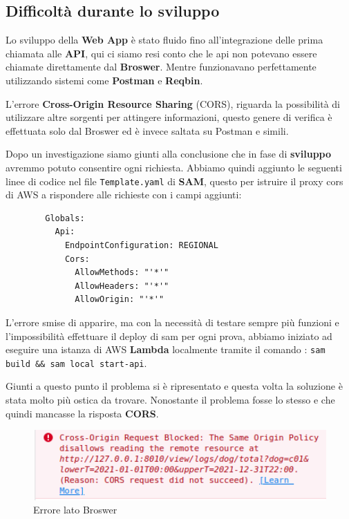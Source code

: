     \subsection{Difficoltà durante lo sviluppo}
    
        Lo sviluppo della \textbf{Web App}  è stato fluido fino all'integrazione delle prima chiamata alle \textbf{API}, qui ci siamo resi conto che le api non potevano essere chiamate direttamente dal \textbf{Broswer}.
        Mentre funzionavano perfettamente utilizzando sistemi come \textbf{Postman} e \textbf{Reqbin}. 
        
        L'errore \textbf{Cross-Origin Resource Sharing} (CORS), riguarda la possibilità di utilizzare altre sorgenti per attingere informazioni, questo genere di verifica è effettuata solo dal Broswer ed è invece saltata su Postman e simili.
        
        Dopo un investigazione siamo giunti alla conclusione che in fase di \textbf{sviluppo} avremmo potuto consentire ogni richiesta. Abbiamo quindi aggiunto le seguenti linee di codice nel file \texttt{Template.yaml} di \textbf{SAM}, questo per istruire il proxy cors di AWS a rispondere alle richieste con i campi aggiunti:
        \begin{lstlisting}
        Globals:
          Api:
            EndpointConfiguration: REGIONAL
            Cors:
              AllowMethods: "'*'"
              AllowHeaders: "'*'"
              AllowOrigin: "'*'"
        \end{lstlisting}
        
        L'errore smise di apparire, ma con la necessità di testare sempre più funzioni e l'impossibilità effettuare il deploy di sam per ogni prova, abbiamo iniziato ad eseguire una istanza di AWS \textbf{Lambda} localmente tramite il comando : \texttt{sam build \&\& sam local start-api}.
        
        Giunti a questo punto il problema si è ripresentato e questa volta la soluzione è stata molto più ostica da trovare.
        Nonostante il problema fosse lo stesso e che quindi mancasse la risposta \textbf{CORS}.

        \begin{figure}[H]
            \caption{Errore lato Broswer}
            \label{fig:ErrorCorsBroswer}
            \centering
            \includegraphics[width=1\textwidth]{Images/CorsErrorFrontEnd.PNG}
        \end{figure}
        
